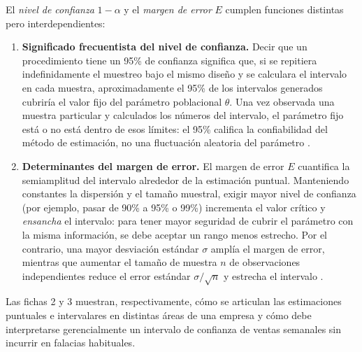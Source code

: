 {El \textit{nivel de confianza} $1-\alpha$ y el \textit{margen de error} $E$ cumplen funciones distintas pero interdependientes:
\begin{enumerate}
  \item \textbf{Significado frecuentista del nivel de confianza.} Decir que un procedimiento tiene un 95\% de confianza significa que, si se repitiera indefinidamente el muestreo bajo el mismo diseño y se calculara el intervalo en cada muestra, aproximadamente el 95\% de los intervalos generados cubriría el valor fijo del parámetro poblacional $\theta$. Una vez observada una muestra particular y calculados los números del intervalo, el parámetro fijo está o no está dentro de esos límites: el 95\% califica la confiabilidad del método de estimación, no una fluctuación aleatoria del parámetro \citep[sec.~8.1]{holmesBusiness2023}\citep[sec.~1.3.5.2]{nistHandbook}.
  \item \textbf{Determinantes del margen de error.} El margen de error $E$ cuantifica la semiamplitud del intervalo alrededor de la estimación puntual. Manteniendo constantes la dispersión y el tamaño muestral, exigir mayor nivel de confianza (por ejemplo, pasar de 90\% a 95\% o 99\%) incrementa el valor crítico y \textit{ensancha} el intervalo: para tener mayor seguridad de cubrir el parámetro con la misma información, se debe aceptar un rango menos estrecho. Por el contrario, una mayor desviación estándar $\sigma$ amplía el margen de error, mientras que aumentar el tamaño de muestra $n$ de observaciones independientes reduce el error estándar $\sigma/\sqrt{n}$ y estrecha el intervalo \citep{holmesBusiness2023}.
\end{enumerate}

Las fichas 2 y 3 muestran, respectivamente, cómo se articulan las estimaciones puntuales e intervalares en distintas áreas de una empresa y cómo debe interpretarse gerencialmente un intervalo de confianza de ventas semanales sin incurrir en falacias habituales.

}
